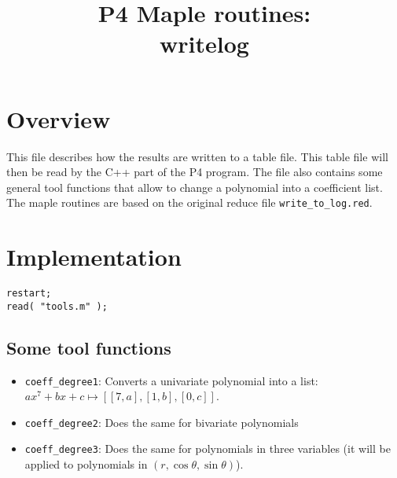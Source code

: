 \documentclass[a4paper,10pt]{article}
\title{P4 Maple routines:\\writelog}
\author{}
\date{}
\begin{document}
\maketitle

\section{Overview}

This file describes how the results are written to a table file.  This table file will then
be read by the C++ part of the P4 program. The file also contains some general tool functions
that allow to change a polynomial into a coefficient list.
The maple routines are based on the original reduce file \verb+write_to_log.red+.

\section{Implementation}

\begin{lstlisting}[name=writelog]
restart;
read( "tools.m" );
\end{lstlisting}

\subsection{Some tool functions}

\begin{itemize}
\item \verb+coeff_degree1+:  Converts a univariate polynomial into a list: $ax^7+bx+c\mapsto [[7,a],[1,b],[0,c]]$.
\item \verb+coeff_degree2+:  Does the same for bivariate polynomials
\item \verb+coeff_degree3+:  Does the same for polynomials in three variables (it will be applied to polynomials
                                in $(r,\cos\theta,\sin\theta)$).
\end{itemize}
\end{document}
